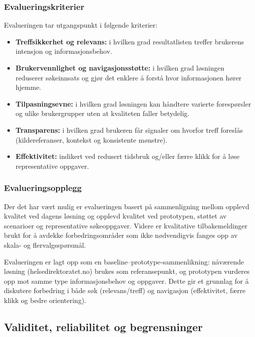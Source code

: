 \subsubsection{Evalueringskriterier}
\label{sec:kriterier}

Evalueringen tar utgangspunkt i følgende kriterier:
\begin{itemize}
    \item \textbf{Treffsikkerhet og relevans:} i hvilken grad resultatlisten treffer brukerens intensjon og informasjonsbehov.
    \item \textbf{Brukervennlighet og navigasjonsstøtte:} i hvilken grad løsningen reduserer søkeinnsats og gjør det enklere å forstå hvor informasjonen hører hjemme.
    \item \textbf{Tilpasningsevne:} i hvilken grad løsningen kan håndtere varierte forespørsler og ulike brukergrupper uten at kvaliteten faller betydelig.
    \item \textbf{Transparens:} i hvilken grad brukeren får signaler om hvorfor treff foreslås (kildereferanser, kontekst og konsistente mønstre).
    \item \textbf{Effektivitet:} indikert ved redusert tidsbruk og/eller færre klikk for å løse representative oppgaver.

\end{itemize}

\subsubsection{Evalueringsopplegg}
\label{sec:opplegg}

Der det har vært mulig er evalueringen basert på sammenligning mellom opplevd kvalitet ved dagens løsning og opplevd kvalitet ved prototypen, støttet av scenarioer og representative søkeoppgaver. Videre er kvalitative tilbakemeldinger brukt for å avdekke forbedringsområder som ikke nødvendigvis fanges opp av skala- og flervalgsspørsmål.

Evalueringen er lagt opp som en baseline--prototype-sammenlikning: nåværende løsning (helsedirektoratet.no) brukes som referansepunkt, og prototypen vurderes opp mot samme type informasjonsbehov og oppgaver. Dette gir et grunnlag for å diskutere forbedring i både søk (relevans/treff) og navigasjon (effektivitet, færre klikk og bedre orientering).


\subsection{Validitet, reliabilitet og begrensninger}
\label{sec:validitet}

